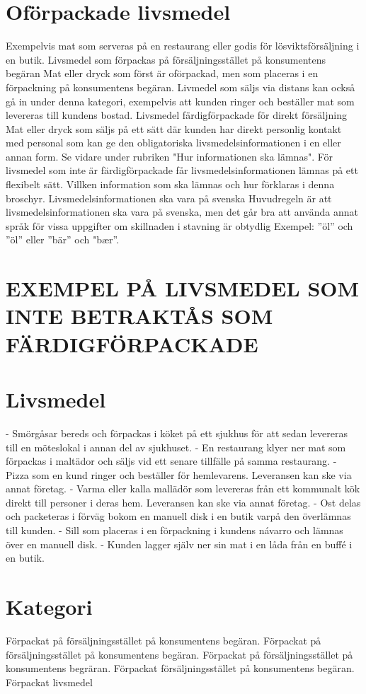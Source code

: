 \section*{Oförpackade livsmedel}
Exempelvis mat som serveras på en restaurang eller godis för lösviktsförsäljning i en butik.
Livsmedel som förpackas på försäljningsstället på konsumentens begäran
Mat eller dryck som först är oförpackad, men som placeras i en förpackning på konsumentens begäran. Livmedel som säljs via distans kan också gå in under denna kategori, exempelvis att kunden ringer och beställer mat som levereras till kundens bostad.
Livsmedel färdigförpackade för direkt försäljning Mat eller dryck som säljs på ett sätt där kunden har direkt personlig kontakt med personal som kan ge den obligatoriska livsmedelsinformationen i en eller annan form. Se vidare under rubriken "Hur informationen ska lämnas".
För livsmedel som inte är färdigförpackade får livsmedelsinformationen lämnas på ett flexibelt sätt. Villken information som ska lämnas och hur förklaras i denna broschyr.
Livsmedelsinformationen ska vara på svenska
Huvudregeln är att livsmedelsinformationen ska vara på svenska, men det går bra att använda annat språk för vissa uppgifter om skillnaden i stavning är obtydlig Exempel: ”öl” och ”öl” eller ”bär” och "bær”.
\section*{EXEMPEL PÅ LIVSMEDEL SOM INTE BETRAKTÅS SOM FÄRDIGFÖRPACKADE}
\section*{Livsmedel}
- Smörgåsar bereds och förpackas i köket på ett sjukhus för att sedan levereras till en möteslokal i annan del av sjukhuset.
- En restaurang klyer ner mat som förpackas i maltädor och säljs vid ett senare tillfälle på samma restaurang.
- Pizza som en kund ringer och beställer för hemlevarens. Leveransen kan ske via annat företag.
- Varma eller kalla mallädör som levereras från ett kommunalt kök direkt till personer i deras hem. Leveransen kan ske via annat företag.
- Ost delas och packeteras i förväg bokom en manuell disk i en butik varpå den överlämnas till kunden.
- Sill som placeras i en förpackning i kundens návarro och lämnas över en manuell disk.
- Kunden lagger själv ner sin mat i en låda från en buffé i en butik.
\section*{Kategori}
Förpackat på försäljningsstället på konsumentens begäran.
Förpackat på försäljningsstället på konsumentens begäran.
Förpackat på försäljningsstället på konsumentens begräran.
Förpackat försäljningsstället på konsumentens begäran.
Förpackat livsmedel

